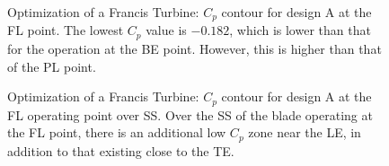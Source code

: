 \begin{figure}[h!]
\begin{minipage}[b]{1\linewidth}
 \centering
\end{minipage}
\caption{Optimization of a Francis Turbine: $C_p$ contour for design A at the FL point. The lowest  $C_p$ value is $-0.182$, which is lower than that for the operation at the BE point. However, this is higher than that of the PL point.}
\label{Francis-A-FL}
\end{figure}


\begin{figure}[h!]
\begin{minipage}[b]{1\linewidth}
 \centering
\end{minipage}
\caption{Optimization of a Francis Turbine: $C_p$ contour for design A at the FL operating point over SS. Over the SS of the blade operating at the FL point, there is an additional low $C_p$ zone near the LE, in addition to that existing close to the TE. }
\label{Francis-A-SS}
\end{figure}

